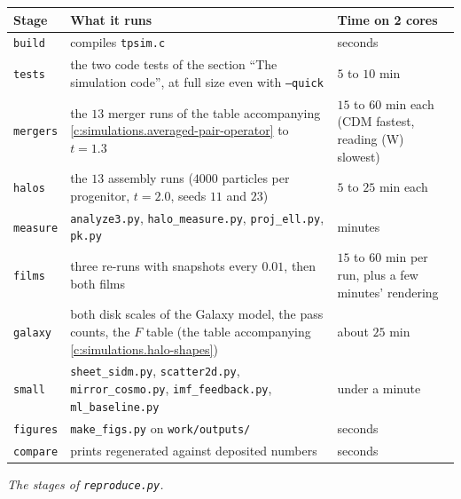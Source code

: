 \documentclass[11pt]{article}
\theoremstyle{definition}
\theoremstyle{plain}
\providecommand{\file}{}\renewcommand{\file}[1]{\texttt{#1}}
\begin{document}
\centering \begin{tabular}{@{}l>{ \arraybackslash}p{}>{ \arraybackslash}p{}@{}}
\toprule
Stage & What it runs & Time on 2 cores \\
\midrule
\texttt{build} & compiles \file{tpsim.c} & seconds \\
\texttt{tests} & the two code tests of the section ``The simulation code'', at full size even with \texttt{--quick} & $5$ to $10$ min \\
\texttt{mergers} & the $13$ merger runs of the table accompanying \ref{c:simulations.averaged-pair-operator} to $t = 1.3$ & $15$ to $60$ min each (CDM fastest, reading (W) slowest) \\
\texttt{halos} & the $13$ assembly runs ($4000$ particles per progenitor, $t = 2.0$, seeds $11$ and $23$) & $5$ to $25$ min each \\
\texttt{measure} & \file{analyze3.py}, \file{halo\_measure.py}, \file{proj\_ell.py}, \file{pk.py} & minutes \\
\texttt{films} & three re-runs with snapshots every $0.01$, then both films & $15$ to $60$ min per run, plus a few minutes' rendering \\
\texttt{galaxy} & both disk scales of the Galaxy model, the pass counts, the $F$ table (the table accompanying \ref{c:simulations.halo-shapes}) & about $25$ min \\
\texttt{small} & \file{sheet\_sidm.py}, \file{scatter2d.py}, \file{mirror\_cosmo.py}, \file{imf\_feedback.py}, \file{ml\_baseline.py} & under a minute \\
\texttt{figures} & \file{make\_figs.py} on \file{work/outputs/} & seconds \\
\texttt{compare} & prints regenerated against deposited numbers & seconds \\
\bottomrule
\end{tabular}

\emph{The stages of \file{reproduce.py}.}
\end{document}
